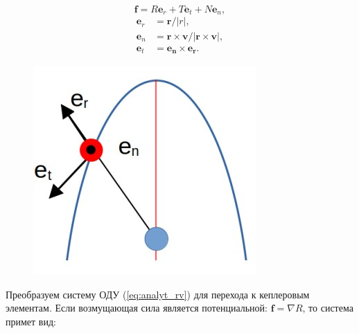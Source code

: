 \begin{equation*}
    \mathbf{f} = R \mathbf{e}_r + T \mathbf{e}_t + N \mathbf{e}_n,
\end{equation*}
\begin{align*}
    \mathbf{e}_r &= \mathbf{r} / |r|, \\
    \mathbf{e}_n &= \mathbf{r} \times \mathbf{v} / |\mathbf{r} \times \mathbf{v}|, \\
    \mathbf{e}_t &= \mathbf{e_n} \times \mathbf{e_r}.
\end{align*}

\begin{figure}[h!]
    \centering
    \includegraphics[width=0.4\linewidth]{../images/review/orbital_system.jpg}
    \label{fig:orbital_system}
\end{figure}

Преобразуем систему ОДУ (\ref{eq:analyt_rv}) для перехода к кеплеровым элементам.
Если возмущающая сила является потенциальной: $\mathbf{f} = \nabla R$, то система примет вид:

